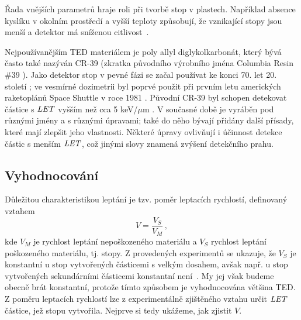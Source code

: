 Řada vnějších parametrů hraje roli při tvorbě stop v plastech. Například absence kyslíku v okolním prostředí a vyšší teploty způsobují, že vznikající stopy jsou menší a detektor má sníženou citlivost~\cite{ambrozova_dvaExperimenty}.

Nejpoužívanějším TED materiálem je poly allyl diglykolkarbonát, který bývá často také nazýván CR-39 (zkratka původního výrobního jména Columbia Resin \#39 \cite{CR39_wiki}). Jako detektor stop v pevné fázi se začal používat ke konci 70. let 20. století \cite{thesisKPBrabcova}; ve vesmírné dozimetrii byl poprvé použit při prvním letu amerických raketoplánů Space Shuttle v roce 1981 \cite{benton}. Původní CR-39 byl schopen detekovat částice s $\mathit{LET}$ vyšším než cca 5 keV/$\mu$m \cite{benton}. V současné době je vyráběn pod různými jmény a s různými úpravami; také do něho bývají přidány další přísady, které mají zlepšit jeho vlastnosti. Některé úpravy ovlivňují i účinnost detekce částic s menším $\mathit{LET}$, což jinými slovy znamená zvýšení detekčního prahu.~\cite{thesisKPBrabcova} 
\subsection{Vyhodnocování}
Důležitou charakteristikou leptání je tzv. poměr leptacích rychlostí, definovaný vztahem
\begin{equation}
  V=\frac{V_S}{V_M}\,,
  \label{eq:pomerLepRychlostiDEF}
\end{equation}
kde $V_M$ je rychlost leptání nepoškozeného materiálu a $V_S$ rychlost leptání poškozeného materiálu, tj. stopy. Z provedených experimentů se ukazuje, že $V_S$ je konstantní u stop vytvořených částicemi s velkým dosahem, avšak např. u stop vytvořených sekundárními částicemi konstantní není~\cite{ssntd}. My jej však budeme obecně brát konstantní, protože tímto způsobem je vyhodnocována většina TED. Z poměru leptacích rychlostí lze z experimentálně zjištěného vztahu určit $\mathit{LET}$ částice, jež stopu vytvořila. Nejprve si tedy ukážeme, jak zjistit $V$.

